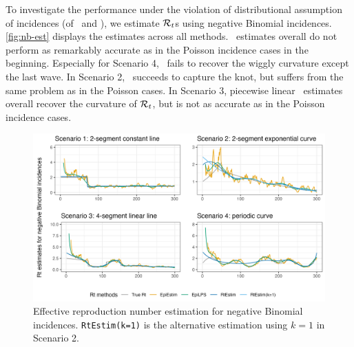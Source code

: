 To investigate the performance under the violation of distributional assumption of incidences (of \RtEstim\ and \EpiEstim), we estimate $\mathcal{R}_t$s using negative Binomial incidences. \autoref{fig:nb-est} displays the estimates across all methods. \RtEstim\ estimates overall do not perform as remarkably accurate as in the Poisson incidence cases in the beginning. Especially for Scenario 4, \RtEstim\ fails to recover the wiggly curvature except the last wave. In Scenario 2, \RtEstim\ succeeds to capture the knot, but suffers from the same problem as in the Poisson cases. In Scenario 3, piecewise linear \RtEstim\ estimates overall recover the curvature of $\mathcal{R}_t$, but is not as accurate as in the Poisson incidence cases.
\begin{figure}[tb]
    \centering
    \includegraphics*[width=160mm]{fig/NB-res-plot.png}
    \caption{Effective reproduction number estimation for negative Binomial incidences. \texttt{RtEstim(k=1)} is the alternative estimation using $k=1$ in Scenario 2.}
    \label{fig:nb-est}
\end{figure}

